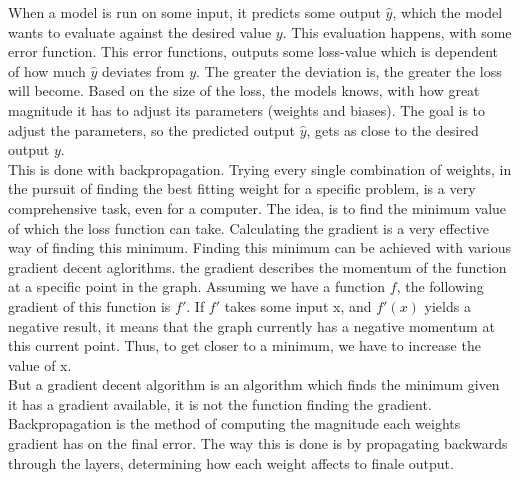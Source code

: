 When a model is run on some input, it predicts some output $\hat{y}$, which the model wants to evaluate against the desired value $y$. This evaluation happens, with some error function. This error functions, outputs some loss-value which is dependent of how much $\hat{y}$ deviates from $y$. The greater the deviation is, the greater the loss will become.
Based on the size of the loss, the models knows, with how great magnitude it has to adjust its parameters (weights and biases). The goal is to adjust the parameters, so the predicted output $\hat{y}$, gets as close to the desired output $y$.\\

\noindent
This is done with backpropagation. Trying every single combination of weights, in the pursuit of finding the best fitting weight for a specific problem, is a very comprehensive task, even for a computer. The idea, is to find the minimum value of which the loss function can take. Calculating the gradient is a very effective way of finding this minimum. Finding this minimum can be achieved with various gradient decent aglorithms. the gradient describes the momentum of the function at a specific point in the graph. Assuming we have a function $f$, the following gradient of this function is $f'$. If $f'$ takes some input x, and $f'(x)$ yields a negative result, it means that the graph currently has a negative momentum at this current point. Thus, to get closer to a minimum, we have to increase the value of x. \\

\noindent
But a gradient decent algorithm is an algorithm which finds the minimum given it has a gradient available, it is not the function finding the gradient. Backpropagation is the method of computing the magnitude each weights gradient has on the final error. The way this is done is by propagating backwards through the layers, determining how each weight affects to finale output.



